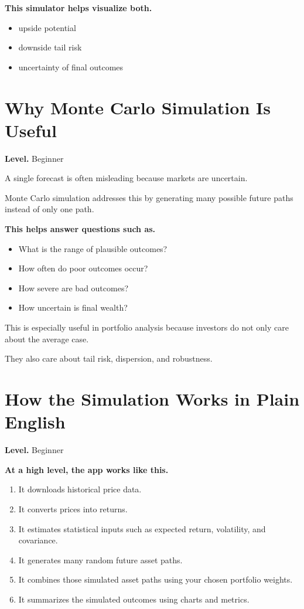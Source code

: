 \documentclass[11pt]{report}
\begin{document}
\textbf{This simulator helps visualize both.}

\begin{itemize}
\item upside potential
\item downside tail risk
\item uncertainty of final outcomes
\end{itemize}

\section{Why Monte Carlo Simulation Is Useful}
\begin{callout}
\textbf{Level.} Beginner
\end{callout}

A single forecast is often misleading because markets are uncertain.

Monte Carlo simulation addresses this by generating many possible future paths instead of only one path.

\textbf{This helps answer questions such as.}

\begin{itemize}
\item What is the range of plausible outcomes?
\item How often do poor outcomes occur?
\item How severe are bad outcomes?
\item How uncertain is final wealth?
\end{itemize}

This is especially useful in portfolio analysis because investors do not only care about the average case.

They also care about tail risk, dispersion, and robustness.

\section{How the Simulation Works in Plain English}
\begin{callout}
\textbf{Level.} Beginner
\end{callout}

\textbf{At a high level, the app works like this.}

\begin{enumerate}
\item It downloads historical price data.
\item It converts prices into returns.
\item It estimates statistical inputs such as expected return, volatility, and covariance.
\item It generates many random future asset paths.
\item It combines those simulated asset paths using your chosen portfolio weights.
\item It summarizes the simulated outcomes using charts and metrics.
\end{enumerate}
\end{document}

